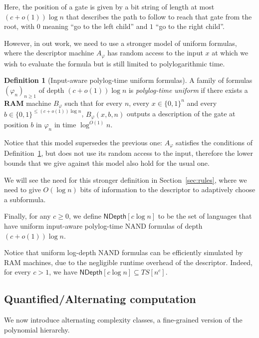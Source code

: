 \documentclass[a4paper, 11pt]{article}
\theoremstyle{plain}
\theoremstyle{definition}
\newtheorem{definition}[theorem]{Definition}
\theoremstyle{remark}
\newcommand{\bit}{\{0,1\}}%
\newcommand{\ND}{\textsf{NDepth}}%
\newcommand{\NDL}[1]{\ND\left[ #1 \log n\right]}%
\begin{document}
Here, the position of a gate is given by a bit string of length at most $(c + o(1))\log n$ 
that describes the path to follow to reach that gate from the root, 
with $0$ meaning ``go to the left child'' and $1$ ``go to the right child''.

However, in out work, we need to use a stronger model of uniform formulas, 
where the descriptor machine $A_\varphi$ has random access to the input $x$ 
at which we wish to evaluate the formula but is still limited to polylogarithmic time.
\begin{definition}[Input-aware polylog-time uniform formulas]\label{def:unif}
	A family of formulas $(\varphi_n)_{n \ge 1}$ of depth $(c + o(1))\log n$ is \textit{polylog-time uniform}
	if there exists a \textbf{RAM} machine $B_\varphi$
	such that for every $n$, every $x\in\bit^n$ and every 
	$b\in\bit^{\leq (c + o(1))\log n}$,
	$B_\varphi(x, b, n)$ outputs a description of the gate at position $b$ in $\varphi_n$ in time $\log^{O(1)} n$.
\end{definition}
Notice that this model supersedes the previous one: 
$A_\varphi$ satisfies the conditions of Definition~\ref{def:unif}, 
but does not use its random access to the input, 
therefore the lower bounds that we give against this model also hold for the usual one.

We will see the need for this stronger definition in Section~\ref{sec:rules}, 
where we need to give $O(\log n)$ bits of information to the descriptor
to adaptively choose a subformula.

Finally, for any $c \ge 0$, we define $\NDL{c}$
to be the set of languages that have uniform 
input-aware polylog-time NAND formulas of depth$(c+o(1)) \log n$.

Notice that uniform log-depth NAND formulas
can be efficiently simulated by RAM machines, 
due to the negligible runtime overhead of the descriptor.
Indeed, for every $c > 1$, we have $\NDL{c} \subseteq TS[n^c]$.

\subsection{Quantified/Alternating computation}

We now introduce alternating complexity classes, a fine-grained version of the polynomial hierarchy.
\end{document}

